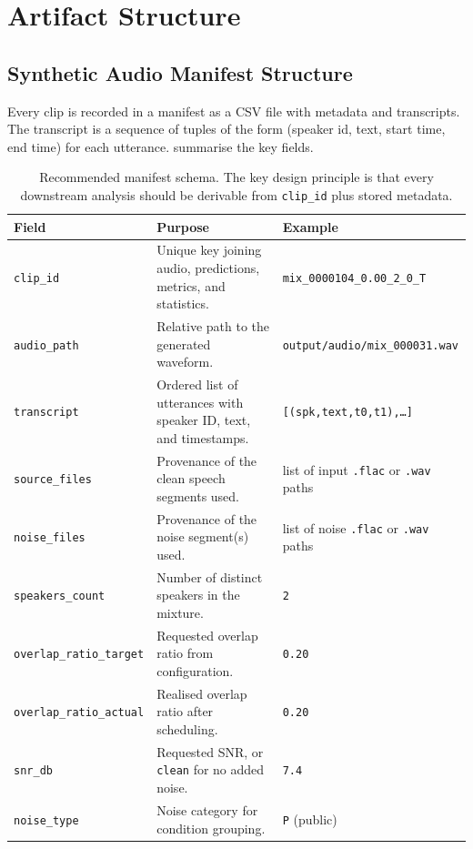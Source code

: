 \section{Artifact Structure}
\subsection{Synthetic Audio Manifest Structure}
Every clip is recorded in a manifest as a CSV file with metadata and transcripts. The transcript is a sequence of tuples of the form (speaker id, text, start time, end time) for each utterance.  summarise the key fields.
\begin{table}[ht]
\centering
\begin{tabularx}{\linewidth}{|@{}l >{\raggedright\arraybackslash}X >{\raggedright\arraybackslash}X@{}|}
\toprule
\textbf{Field} & \textbf{Purpose} & \textbf{Example} \\
\midrule
\texttt{clip\_id} & Unique key joining audio, predictions, metrics, and statistics. & \texttt{mix\_0000104\_0.00\_2\_0\_T} \\
\hline
\texttt{audio\_path} & Relative path to the generated waveform. & \texttt{output/audio/mix\_000031.wav} \\
\hline
\texttt{transcript} & Ordered list of utterances with speaker ID, text, and timestamps. & \texttt{[(spk,text,t0,t1),\dots]} \\
\hline
\texttt{source\_files} & Provenance of the clean speech segments used. & list of input \texttt{.flac} or \texttt{.wav} paths \\
\hline
\texttt{noise\_files} & Provenance of the noise segment(s) used. & list of noise \texttt{.flac} or \texttt{.wav} paths \\
\hline
\texttt{speakers\_count} & Number of distinct speakers in the mixture. & \texttt{2} \\
\hline
\texttt{overlap\_ratio\_target} & Requested overlap ratio from configuration. & \texttt{0.20} \\
\hline
\texttt{overlap\_ratio\_actual} & Realised overlap ratio after scheduling. & \texttt{0.20} \\
\hline
\texttt{snr\_db} & Requested SNR, or \texttt{clean} for no added noise. & \texttt{7.4} \\
\hline
\texttt{noise\_type} & Noise category for condition grouping. & \texttt{P} (public) \\
\bottomrule
\end{tabularx}
\caption{Recommended manifest schema. The key design principle is that every downstream analysis should be derivable from \texttt{clip\_id} plus stored metadata.}
\label{tab:manifest_schema}
\end{table}

